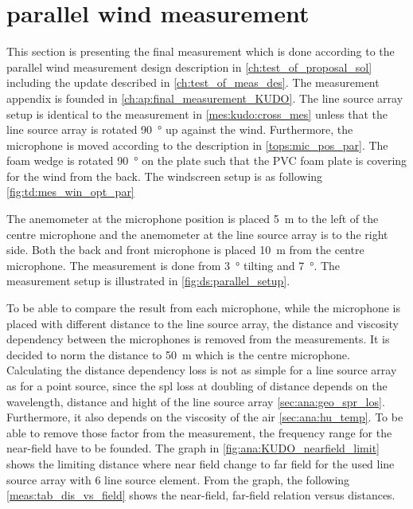 \newpage
\section{parallel wind measurement}\label{mes:kudo:par_mes}
This section is presenting the final measurement which is done according to the parallel wind measurement design description in \autoref{ch:test_of_proposal_sol} including the update described in \autoref{ch:test_of_meas_des}. The measurement appendix is founded in \autoref{ch:ap:final_measurement_KUDO}. The line source array setup is identical to the measurement in \autoref{mes:kudo:cross_mes} unless that the line source array is rotated \SI{90}{\degree} up against the wind. Furthermore, the microphone is moved according to the description in \autoref{tops:mic_pos_par}. The foam wedge is rotated \SI{90}{\degree} on the plate such that the PVC foam plate is covering for the wind from the back. The windscreen setup is as following \autoref{fig:td:mes_win_opt_par}   



The anemometer at the microphone position is placed \SI{5}{\meter} to the left of the centre microphone and the anemometer at the line source array is to the right side. Both the back and front microphone is placed \SI{10}{\meter} from the centre microphone. The measurement is done from  \SI{3}{\degree} tilting and \SI{7}{\degree}. The measurement setup is illustrated in \autoref{fig:ds:parallel_setup}.



To be able to compare the result from each microphone, while the microphone is placed with different distance to the line source array, the distance and viscosity dependency between the microphones is removed from the measurements. It is decided to norm the distance to \SI{50}{\meter} which is the centre microphone. Calculating the distance dependency loss is not as simple for a line source array as for a point source, since the \gls{spl} loss at doubling of distance depends on the wavelength, distance and hight of the line source array \autoref{sec:ana:geo_spr_los}. Furthermore, it also depends on the viscosity of the air \autoref{sec:ana:hu_temp}. To be able to remove those factor from the measurement, the frequency range for the near-field have to be founded. The graph in \autoref{fig:ana:KUDO_nearfield_limit} shows the limiting distance where near field change to far field for the used line source array with 6 line source element. From the graph, the following \autoref{meas:tab_dis_vs_field} shows the near-field, far-field relation versus distances. 

